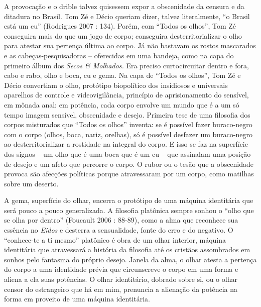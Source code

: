 A provocação e o drible talvez quisessem expor a obscenidade da censura
e da ditadura no Brasil. Tom Zé e Décio queriam dizer, talvez
literalmente, ``o Brasil está um cu'' (Rodrigues 2007 : 134). Porém, com
``Todos os olhos'',\emph{ }Tom Zé conseguira mais do que um jogo de
corpo; conseguira desterritorializar o olho para atestar sua pertença
última ao corpo. Já não bastavam os rostos mascarados e as
cabeças-pesquisadoras -- oferecidas em uma bandeja, como na capa do
primeiro álbum dos \emph{Secos \& Molhados.} Era preciso curtocircuitar
dentro e fora, cabo e rabo, olho e boca, cu e gema. Na capa de ``Todos
os olhos'', Tom Zé e Décio convertiam o olho, protótipo biopolítico dos
insidiosos e universais aparelhos de controle e videovigilância,
princípio de aprisionamento do sensível, em mônada anal: em potência,
cada corpo envolve um mundo que é a um só tempo imagem sensível,
obscenidade e desejo. Primeira tese de uma filosofia dos corpos
misturados que ``Todos os olhos'' inventa: se é possível fazer
buraco-negro com o corpo (olhos, boca, nariz, orelhas), só é possível
desfazer um buraco-negro ao desterritorializar a rostidade na integral
do corpo. E isso se faz na superfície dos signos -- um olho que é uma
boca que é um cu -- que assinalam uma posição de desejo e um afeto que
percorre o corpo. O rubor ou o tesão que a obscenidade provoca são
afecções políticas porque atravessaram por um corpo, como matilhas sobre
um deserto.

A gema, superfície do olhar, encerra o protótipo de uma máquina
identitária que será pouco a pouco generalizada. A filosofia platônica
sempre sonhou o ``olho que se olha por dentro'' (Foucault 2006 : 88-89),
como a alma que reconhece sua essência no \emph{Eidos} e desterra a
sensualidade, fonte do erro e do negativo. O ``conhece-te a ti mesmo''
platônico é obra de um olhar interior, máquina identitária que
atravessará a história da filosofia até os cristãos assombrados em
sonhos pelo fantasma do próprio desejo. Janela da alma, o olhar atesta a
pertença do corpo a uma identidade prévia que circunscreve o corpo em
uma forma e aliena a ela suas potências. O olhar identitário, dobrado
sobre si, ou o olhar censor do estrangeiro que há em mim, prenuncia a
alienação da potência na forma em proveito de uma máquina identitária.

